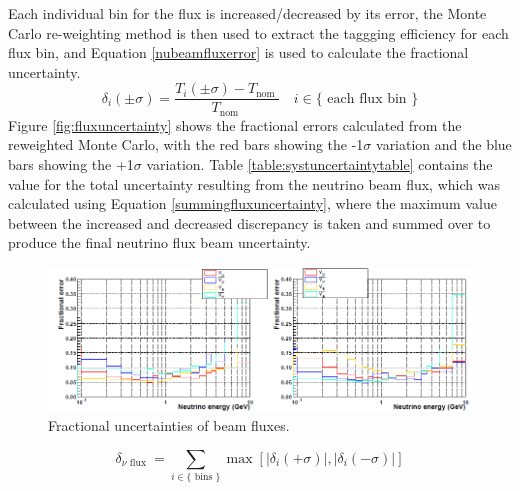 Each individual bin for the flux is increased/decreased by its error, the Monte Carlo re-weighting method is then used to extract the taggging efficiency for each flux bin, and Equation \eqref{nubeamfluxerror} is used to calculate the fractional uncertainty.
\newline
\begin{equation}
    \delta_{i}(\pm \sigma)=\frac{T_{i}(\pm \sigma)-T_{\text {nom }}}{T_{\text {nom }}} \quad i \in\{\text { each flux bin }\}
\label{nubeamfluxerror}
\end{equation}
\newline
Figure \ref{fig:fluxuncertainty} shows the fractional errors calculated from the reweighted Monte Carlo, with the red bars showing the -1$\sigma$ variation and the blue bars showing the +1$\sigma$ variation. Table \ref{table:systuncertaintytable} contains the value for the total uncertainty resulting from the neutrino beam flux, which was calculated using Equation \eqref{summingfluxuncertainty}, where the maximum value between the increased and decreased discrepancy is taken and summed over to produce the final neutrino flux beam uncertainty.
\newline

\begin{figure}[H]
    \includegraphics[scale=0.4]{Figures/frac_beam_flux_uncertainty.png}
    \caption{Fractional uncertainties of beam fluxes.}
    \label{fig:frac_beam_flux_uncertainty}
\end{figure}


\begin{equation}
    \delta_{\nu \text { flux }}=\sum_{i \in\{\text { bins }\}} \max \left[\left|\delta_{i}(+\sigma)\right|,\left|\delta_{i}(-\sigma)\right|\right]
 \label{summingfluxuncertainty}   
\end{equation}


